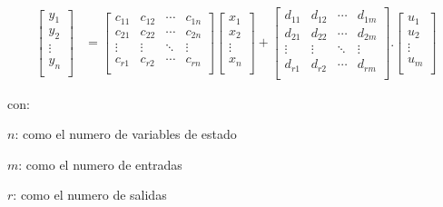 \begin{align}
\begin{bmatrix}
                    y_{1}\\
                    y_{2}\\
                    \vdots\\
                    y_{n}\\
                    \end{bmatrix}&=
                    \begin{bmatrix}
                    c_{11} & c_{12} & \cdots & c_{1n}\\
                    c_{21} & c_{22} & \cdots & c_{2n}\\
                    \vdots & \vdots & \ddots & \vdots\\
                    c_{r1} & c_{r2} & \cdots & c_{rn}\\
                    \end{bmatrix}
                    \begin{bmatrix}
                    x_{1}\\
                    x_{2}\\
                    \vdots\\
                    x_{n}\\
                    \end{bmatrix}+
                    \begin{bmatrix}
                    d_{11} & d_{12} & \cdots & d_{1m}\\
                    d_{21} & d_{22} & \cdots & d_{2m}\\
                    \vdots & \vdots & \ddots & \vdots\\
                    d_{r1} & d_{r2} & \cdots & d_{rm}\\
                    \end{bmatrix}.
                    \begin{bmatrix}
                    u_{1}\\
                    u_{2}\\
                    \vdots\\
                    u_{m}\\
                    \end{bmatrix}
            \end{align}
            \vspace{20pt}

            \begin{spacing}{1.5}
				con: 
				
				$n$: como el numero de variables de estado
				
				$m$: como el numero de entradas
				
				$r$: como el numero de salidas
				
            \end{spacing}

